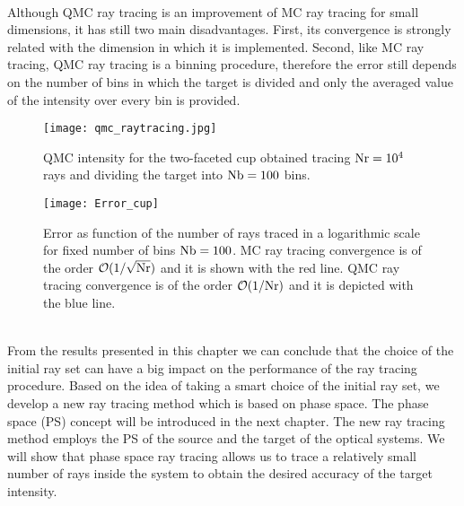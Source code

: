 \\\indent Although QMC ray tracing is an improvement of MC ray tracing for small dimensions, it has still two main disadvantages. 
First, its convergence is strongly related with the dimension in which it is implemented.
Second, like MC ray tracing, QMC ray tracing is a binning procedure, therefore the error still depends on the number of bins in which the target is divided and only the averaged value of the intensity over every bin is provided.
\begin{figure}[t]
\begin{center}
    \texttt{[image: qmc\_raytracing.jpg]}
    \caption{QMC intensity for the two-faceted cup obtained tracing $\textrm{Nr}=10^4$ rays and dividing the target into $\textrm{Nb}=100$ bins.}
    \label{fig:qmc_intensity}
\end{center}
  \end{figure}
\begin{figure}[h]
\begin{center}
    \texttt{[image: Error\_cup]}
    \caption{Error as function of the number of rays traced in a logarithmic scale for fixed number of bins $\textrm{Nb}=100$.
 MC ray tracing convergence is of the order $\mathcal{O}(1/\sqrt{\textrm{Nr}})$ and it is shown with the red line. 
QMC ray tracing convergence is of the order $\mathcal{O}(1/\textrm{Nr})$ and it is depicted with the blue line.}
    \label{fig:Error_cup}
\end{center}
  \end{figure}
 \\ \indent
From the results presented in this chapter we can conclude that the choice of the initial ray set can have a big impact on the performance of the ray tracing procedure. 
Based on the idea of taking a smart choice of the initial ray set, we develop a new ray tracing method which is based on phase space. 
The phase space (PS) concept will be introduced in the next chapter. The new ray tracing method employs the PS of the source and the target of the optical systems.
We will show that phase space ray tracing allows us to trace a relatively small number of rays inside the system to obtain the desired accuracy of the target intensity. 





















